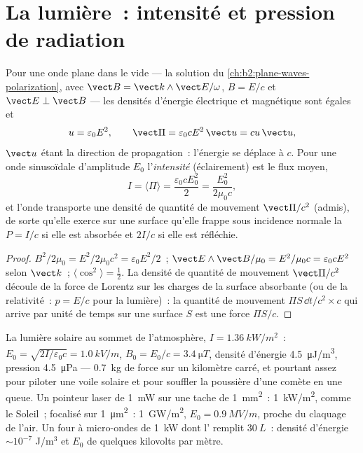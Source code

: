 \section{La lumière~: intensité et pression de radiation}

\begin{proposition}\label{prop:b2:poynting-vector:wave}
Pour une onde plane dans le vide --- la solution du \cref{ch:b2:plane-waves-polarization},
avec $\vect B = \vect k\wedge\vect E/\omega$, $B = E/c$ et $\vect E \perp \vect B$ ---
les densités d'énergie électrique et magnétique sont égales et
\[
u = \varepsilon_0E^2 , \qquad \vect\Pi = \varepsilon_0cE^2\,\vect u = cu\,\vect u ,
\]
$\vect u$ étant la direction de propagation~: l'énergie se déplace à $c$.
Pour une onde sinusoïdale d'amplitude $E_0$ l'\emph{intensité}
(éclairement) est le flux moyen,
\[
I = \langle\Pi\rangle = \frac{\varepsilon_0cE_0^2}2 = \frac{E_0^2}{2\mu_0c} ,
\]
et l'onde transporte une densité de quantité de mouvement $\vect\Pi/c^2$ (admis), de sorte
qu'elle exerce sur une surface qu'elle frappe sous incidence normale la
\emph{} $P = I/c$ si elle est absorbée et $2I/c$ si elle est réfléchie.
\end{proposition}

\begin{proof}
$B^2/2\mu_0 = E^2/2\mu_0c^2 = \varepsilon_0E^2/2$~; $\vect E\wedge\vect B/\mu_0 = E^2/\mu_0c =
\varepsilon_0cE^2$ selon $\vect k$~; $\langle\cos^2\rangle = \tfrac12$. La densité de quantité
de mouvement $\vect\Pi/c^2$ découle de la force de Lorentz sur les charges de
la surface absorbante (ou de la relativité~: $p = E/c$ pour la lumière)~: la
quantité de mouvement $\Pi S\,\dd t/c^2\times c$ qui arrive par unité de temps sur une surface $S$ est
une force $\Pi S/c$.
\end{proof}

\begin{example}\label{ex:b2:poynting-vector:orders}
La lumière solaire au sommet de l'atmosphère, $I = \qty{1.36}{kW/m^2}$~: $E_0 =
\sqrt{2I/\varepsilon_0c} = \qty{1.0}{kV/m}$, $B_0 = E_0/c = \qty{3.4}{\micro T}$, densité
d'énergie \qty{4.5}{\micro J/m^3}, pression \qty{4.5}{\micro Pa} --- \qty{0.7}{kg}
de force sur un kilomètre carré, et pourtant assez pour piloter une voile solaire et pour
souffler la poussière d'une comète en une queue. Un pointeur laser de \qty{1}{mW} sur une
tache de \qty{1}{mm^2}~: \qty{1}{kW/m^2}, comme le Soleil~; focalisé sur \qty{1}{\micro m^2}~:
\qty{1}{GW/m^2}, $E_0 = \qty{0.9}{MV/m}$, proche du claquage de l'air. Un
four à micro-ondes de \qty{1}{kW} dont l' remplit $\qty{30}{L}$~: densité
d'énergie $\sim 10^{-7}$ J/m$^3$ et $E_0$ de quelques kilovolts par mètre.
\end{example}


